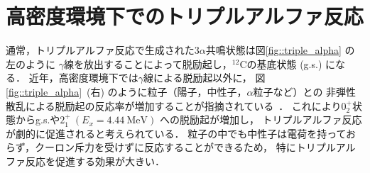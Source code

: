 \documentclass[../master]{subfiles}
\begin{document}
\section{高密度環境下でのトリプルアルファ反応}
\label{seq::triplealphareaction}
通常，トリプルアルファ反応で生成された$3\alpha$共鳴状態は図\ref{fig::triple_alpha} の左のように
$\gamma$線を放出することによって脱励起し，${}^{12}\mathrm{C}$の基底状態 (g.s.) になる．
近年，高密度環境下では$\gamma$線による脱励起以外に，
図\ref{fig::triple_alpha}~(右) のように粒子（陽子，中性子，$\alpha$粒子など）との
非弾性散乱による脱励起の反応率が増加することが指摘されている~\cite{hotdensemedium}．
これにより$0_2^+$状態からg.s.や$2_{1}^{+}\ (E_{x} = \SI{4.44}{\mega\electronvolt})$ への脱励起が増加し，
トリプルアルファ反応が劇的に促進されると考えられている．
粒子の中でも中性子は電荷を持っておらず，クーロン斥力を受けずに反応することができるため，
特にトリプルアルファ反応を促進する効果が大きい．


\end{document}
